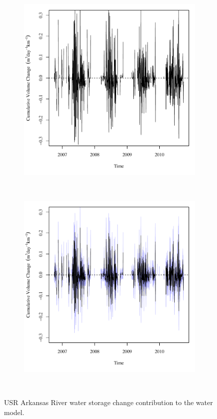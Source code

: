 \begin{linenumbers}
\begin{figure}[htbp]
\centering
	\begin{subfigure}{0.5\textwidth}
		\centering
		\includegraphics[width=0.9\linewidth]{"Figures/Results_USR/Deterministic/Balance Water - storage"}
		\label{sub:USRWaterStoreD}
	\end{subfigure}\\%
	\begin{subfigure}{0.5\textwidth}
		\centering
		\missingfigure{}
		\includegraphics[width=0.9\linewidth]{"Figures/Results_USR/Stochastic/Balance Water - storage"}
		\label{sub:USRWaterStoreS}
	\end{subfigure}\\
	\caption[USR Arkansas River water storage change contribution to the water model.]{USR Arkansas River water storage change contribution to the water model.}
	\label{fig:USRWaterStore}
\end{figure}


\end{linenumbers}
